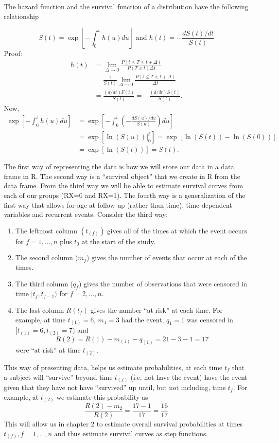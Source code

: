 \documentclass{article}
\begin{document}
 The hazard function and the survival function of a distribution have the following relationship

\[ S(t) = \exp\left[-\int_0^t h(u) du\right] \text{ and } h(t) = -\frac{d S(t)/dt}{S(t)}
\]
Proof:
\begin{align*} h(t) & = \lim_{\Delta \rightarrow 0} \frac{P(t \le T \le t + \Delta)} {P(T \ge t) \Delta t} \\
& = \frac{1}{S(t)} \lim_{\Delta \rightarrow 0} \frac{P(t \le T < t + \Delta)} {\Delta t} \\
& = \frac{(d/dt)F(t)}{S(t)} = -\frac{(d/dt)S(t)}{S(t)}.
\end{align*}
Now,
\begin{align*}
\exp\left[-\int_0^t h(u) du\right] & = \exp\left[-\int_0^t \left(-\frac{dS(u)/du}{S(u)} \right)du\right] \\
&= \exp\left[\ln (S(u)) |_0^t \right] = \exp\left[\ln(S(t)) - \ln(S(0))\right] \\
& = \exp\left[\ln(S(t))\right] = S(t).
\end{align*}

 The first way of representing the data is how we will store our data in a data frame in R. The second way is a ``survival object'' that we create in R from the data frame. From the third way we will be able to estimate survival curves from each of our groups (RX=0 and RX=1). The fourth way is a generalization of the first way that allows for age at follow up (rather than time), time-dependent variables and recurrent events. Consider the third way: 
\begin{enumerate}[ ]
\item The leftmost column $(t_{(f)})$ gives all of the times at which the event occurs for $f=1,\ldots,n$ plus $t_0$ at the start of the study.
\item The second column ($m_f$) gives the number of events that occur at each of the times.
\item The third column ($q_f$) gives the number of observations that were censored in time $[t_f,t_{f-1})$ for $f=2,\ldots,n$.
\item The last column $R(t_f)$ gives the number ``at risk'' at each time. For example, at time $t_{(1)}=6$, $m_{1}=3$ had the event, $q_{1}=1$ was censored in $[t_{(1)}=6, t_{(2)}=7)$ and
    \[
    R(2)=R(1)-m_{(1)}-q_{(1)}=21-3-1=17
    \]
     were ``at risk'' at time $t_{(2)}$.
\end{enumerate}
This way of presenting data, helps us estimate probabilities, at each time $t_{f}$ that a subject will ``survive'' beyond time $t_{(f)}$ (i.e. not have the event) have the event given that they have not have ``survived'' up until, but not including, time $t_{f}$. For example, at $t_{(2)}$ we estimate this probability as
\[ \dfrac{R(2)-m_2}{R{(2)}} = \dfrac{17-1}{17} = \dfrac{16}{17}
\]
This will allow us in chapter 2 to estimate overall survival probabilities at times $t_{(f)}, f=1,\ldots,n$ and thus estimate survival curves as step functions.
\end{document}
